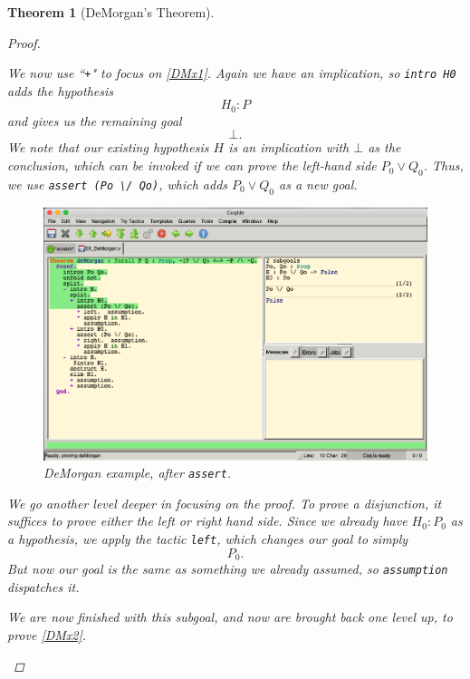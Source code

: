 \documentclass[12pt,notitlepage]{report}
\theoremstyle{plain}
\newtheorem{theo}{Theorem}[section]
\theoremstyle{definition}
\numberwithin{equation}{section}
\begin{document}
\begin{theo}[DeMorgan's Theorem]
\begin{proof}
\begin{figure}[H]
    \label{fig:demorgan1}
\end{figure}
        \par \medskip
        We now use ``\texttt{+}" to focus on \eqref{DMx1}.  Again we have an implication, so \texttt{intro H0} adds the hypothesis 
        \[
            H_0 : P
        \]
        and gives us the remaining goal 
        \[
            \bot.
        \]
        We note that our existing hypothesis $H$ is an implication with $\bot$ as the conclusion, which can be invoked if we can prove the left-hand side $P_0 \lor Q_0$.  Thus, we use \texttt{assert (Po \textbackslash / Qo)}, which adds $P_0 \lor Q_0$ as a new goal.
        \par \medskip
          \noindent
\begin{figure}[H]
    \centering
          \includegraphics[scale=0.45]{DeMorgan4}
              \caption{DeMorgan example, after \texttt{assert}.}
    \label{fig:demorgan1}
\end{figure}
        \par \medskip
        We go another level deeper in focusing on the proof.  To prove a disjunction, it suffices to prove either the left or right hand side.  Since we already have $H_0 : P_0$ as a hypothesis, we apply the tactic \texttt{left}, which changes our goal to simply
        \[
         P_0.
        \]
        But now our goal is the same as something we already assumed, so \texttt{assumption} dispatches it.
        \par We are now finished with this subgoal, and now are brought back one level up, to prove \eqref{DMx2}.
        \par \medskip
          \noindent
\begin{figure}[H]

\end{figure}
\end{proof}
\end{theo}
\end{document}
